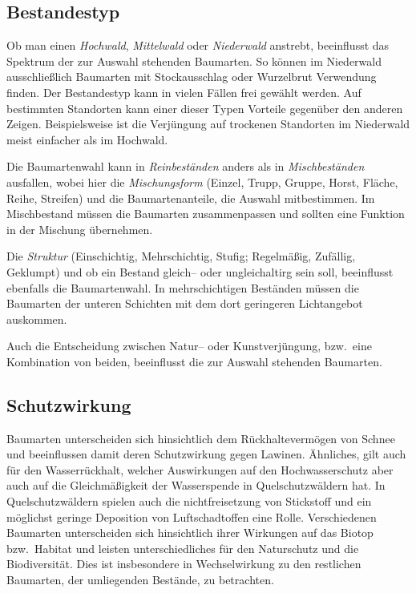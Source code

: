 \documentclass[twocolumn]{scrartcl}
\begin{document}
\subsection{Bestandestyp}
\label{ssec:bestandestyp}

Ob man einen \emph{Hochwald}, \emph{Mittelwald} oder \emph{Niederwald}
anstrebt, beeinflusst das Spektrum der zur Auswahl stehenden
Baumarten. So können im Niederwald ausschließlich Baumarten mit
Stockausschlag oder Wurzelbrut Verwendung finden. Der Bestandestyp
kann in vielen Fällen frei gewählt werden. Auf bestimmten Standorten
kann einer dieser Typen Vorteile gegenüber den anderen
Zeigen. Beispielsweise ist die Verjüngung auf trockenen Standorten im
Niederwald meist einfacher als im Hochwald.

Die Baumartenwahl kann in \emph{Reinbeständen} anders als in
\emph{Mischbeständen} ausfallen, wobei hier die \emph{Mischungsform}
(Einzel, Trupp, Gruppe, Horst, Fläche, Reihe, Streifen) und die
Baumartenanteile, die Auswahl mitbestimmen. Im Mischbestand müssen die
Baumarten zusammenpassen und sollten eine Funktion in der Mischung
übernehmen.

Die \emph{Struktur} (Einschichtig, Mehrschichtig, Stufig; Regelmäßig,
Zufällig, Geklumpt) und ob ein Bestand gleich-- oder ungleichaltirg
sein soll, beeinflusst ebenfalls die Baumartenwahl. In mehrschichtigen
Beständen müssen die Baumarten der unteren Schichten mit dem dort
geringeren Lichtangebot auskommen.

Auch die Entscheidung zwischen Natur-- oder Kunstverjüngung, bzw.\
eine Kombination von beiden, beeinflusst die zur Auswahl stehenden
Baumarten.

\subsection{Schutzwirkung}
\label{ssec:schutz}

Baumarten unterscheiden sich hinsichtlich dem Rückhaltevermögen von
Schnee und beeinflussen damit deren Schutzwirkung gegen
Lawinen. Ähnliches, gilt auch für den Wasserrückhalt, welcher
Auswirkungen auf den Hochwasserschutz aber auch auf die
Gleichmäßigkeit der Wasserspende in Quelschutzwäldern hat. In
Quelschutzwäldern spielen auch die nichtfreisetzung von Stickstoff und
ein möglichst geringe Deposition von Luftschadtoffen eine Rolle.
Verschiedenen Baumarten unterscheiden sich hinsichtlich ihrer
Wirkungen auf das Biotop bzw.\ Habitat und leisten unterschiedliches
für den Naturschutz und die Biodiversität. Dies ist insbesondere in
Wechselwirkung zu den restlichen Baumarten, der umliegenden Bestände,
zu betrachten.
\end{document}
